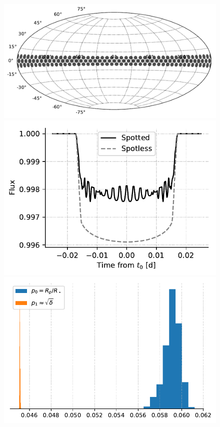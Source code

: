 \begin{subappendices}
\begin{figure}
    \centering
    \includegraphics[scale=0.5]{spot_map_4.pdf}
    \includegraphics[scale=0.6]{transit_quad_4.pdf}
    \includegraphics[scale=0.7]{rms4_agreement.pdf}

\end{figure}
\end{subappendices}
